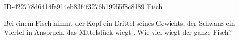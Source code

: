 \begin{exercise}
      {ID-422778d6414fe914eb83f4f3276b19955f8c8189}
      {Fisch}
  \ifproblem\problem\par
    Bei einem Fisch nimmt der Kopf ein Drittel seines Gewichts, der Schwanz
    ein Viertel in Anspruch, das Mittelstück wiegt . Wie viel wiegt
    der ganze Fisch?
  \fi
\end{exercise}
